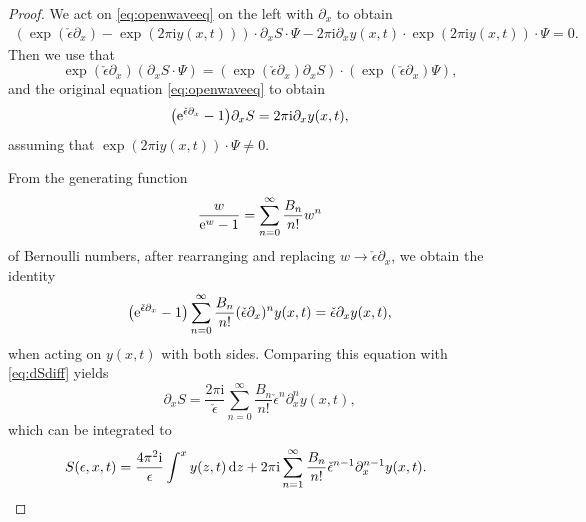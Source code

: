 \documentclass[pdftex]{sigma}
\numberwithin{equation}{section}
\begin{document}
\begin{proof}
We act on \eqref{eq:openwaveeq} on the left with $\partial_x$ to obtain
\begin{gather*}
 (\exp(\check{\epsilon}\partial_x)-\exp(2\pi \mathrm{i} y(x,t)))\cdot \partial_x S\cdot \Psi - 2\pi \mathrm{i} \partial_x y(x,t)\cdot \exp(2\pi \mathrm{i} y(x,t)) \cdot \Psi =0.
\end{gather*}
Then we use that
\begin{equation*}
\exp(\check{\epsilon}\partial_x) (\partial_x S\cdot \Psi)= (\exp(\check{\epsilon}\partial_x) \partial_x S) \cdot (\exp(\check{\epsilon}\partial_x)\Psi),
\end{equation*}
and the original equation \eqref{eq:openwaveeq} to obtain
\begin{equation}\label{eq:dSdiff}
 \big({\rm e}^{\check{\epsilon}\partial_x}-1\big) \partial_x S = 2\pi \mathrm{i} \partial_x y(x,t),
\end{equation}
assuming that $\exp(2\pi \mathrm{i} y(x,t)) \cdot \Psi \ne 0$.

From the generating function
\begin{equation*}
\frac{w}{{\rm e}^w-1}=\sum_{n=0}^{\infty}\frac{B_n}{n!} w^n
\end{equation*}
of Bernoulli numbers, after rearranging and replacing $w\rightarrow \check{\epsilon} \partial_x$, we obtain the identity
\begin{equation*}
 \big({\rm e}^{\check{\epsilon}\partial_x}-1\big) \sum_{n=0}^{\infty}\frac{B_n}{n!} (\check{\epsilon}\partial_x)^n y(x,t)= \check{\epsilon} \partial_x y(x,t),
\end{equation*}
when acting on $y(x,t)$ with both sides. Comparing this equation with \eqref{eq:dSdiff} yields
\begin{equation*}
 \partial_x S= \frac{2\pi \mathrm{i}}{\check{\epsilon}} \sum_{n=0}^{\infty} \frac{B_n}{n!}\check{\epsilon}^n \partial_x^n y(x,t),
\end{equation*}
which can be integrated to
\begin{equation*}
S(\epsilon,x,t)= \frac{4\pi^2 \mathrm{i}}{\epsilon} \int^x y(z,t)\,{\rm d}z + 2\pi \mathrm{i} \sum_{n=1}^{\infty} \frac{B_n}{n!} \check{\epsilon}^{n-1} \partial_x^{n-1} y(x,t). \tag*{\qed}
\end{equation*}
\renewcommand{\qed}{}
\end{proof}
\end{document}
